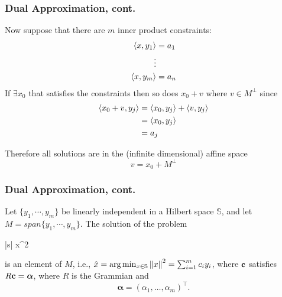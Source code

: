 \documentclass{beamer}
\begin{document}
\begin{frame}\frametitle{Dual Approximation, cont.}	

	Now suppose that there are $m$ inner product constraints:
	\begin{align*}
	\left< x, y_1\right> &= a_1\\
	\vdots\\
	\left< x, y_m\right> &= a_n
	\end{align*}
	If $\exists x_0$ that satisfies the constraints then so does $x_0 + v$ where $v \in M^{\perp}$ since
	\begin{align*}
	\left< x_0+v, y_j\right> &= \left< x_0, y_j\right> + \left<v, y_j\right> \\
						&= \left< x_0,y_j\right> \\
						&= a_j 
	\end{align*}
	
	Therefore all solutions are in the (infinite dimensional) affine space
	\[ v = x_0 + M^{\perp} \]
	
\end{frame}

\begin{frame}\frametitle{Dual Approximation, cont.}	
	\begin{theorem}
		Let $\{ y_1, \cdots, y_m\} $ be linearly independent in a Hilbert
		space $\mathbb{S}$, and let $M = span\{y_1, \cdots, y_m\}$.	
		The solution of the problem
		\begin{mini*}|s|
		{x\in {}}{^2}{}{}
		\addConstraint{\vdots}
		\end{mini*}
		is an element of $M$, i.e., $\hat{x} = \arg\min_{x\in\mathbb{S}}\left\|x\right\|^2 = \sum_{i=1}^{m} c_i y_i$,
		where $\mathbf{c}$ satisfies $R\mathbf{c} = \boldsymbol{\alpha}$, where $R$ is the Grammian and 
		\[
			\boldsymbol{\alpha} = (\alpha_1, \dots, \alpha_m)^\top.
		\]
	\end{theorem}
	
\end{frame}
\end{document}
